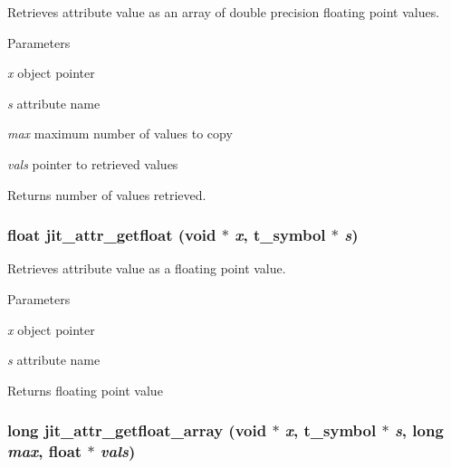 Retrieves attribute value as an array of double precision floating point values. 
\begin{DoxyParams}{Parameters}
\item[{\em x}]object pointer \item[{\em s}]attribute name \item[{\em max}]maximum number of values to copy \item[{\em vals}]pointer to retrieved values\end{DoxyParams}
\begin{DoxyReturn}{Returns}
number of values retrieved. 
\end{DoxyReturn}
\hypertarget{group__attrmod_ga33a62b951e41b79d8d19907d96b093f6}{
\subsubsection[{jit\_\-attr\_\-getfloat}]{\setlength{\rightskip}{0pt plus 5cm}float jit\_\-attr\_\-getfloat (void $\ast$ {\em x}, \/  {\bf t\_\-symbol} $\ast$ {\em s})}}
\label{group__attrmod_ga33a62b951e41b79d8d19907d96b093f6}


Retrieves attribute value as a floating point value. 
\begin{DoxyParams}{Parameters}
\item[{\em x}]object pointer \item[{\em s}]attribute name\end{DoxyParams}
\begin{DoxyReturn}{Returns}
floating point value 
\end{DoxyReturn}
\hypertarget{group__attrmod_ga5282561e957ac1c113abf448250293da}{
\subsubsection[{jit\_\-attr\_\-getfloat\_\-array}]{\setlength{\rightskip}{0pt plus 5cm}long jit\_\-attr\_\-getfloat\_\-array (void $\ast$ {\em x}, \/  {\bf t\_\-symbol} $\ast$ {\em s}, \/  long {\em max}, \/  float $\ast$ {\em vals})}}
\label{group__attrmod_ga5282561e957ac1c113abf448250293da}


